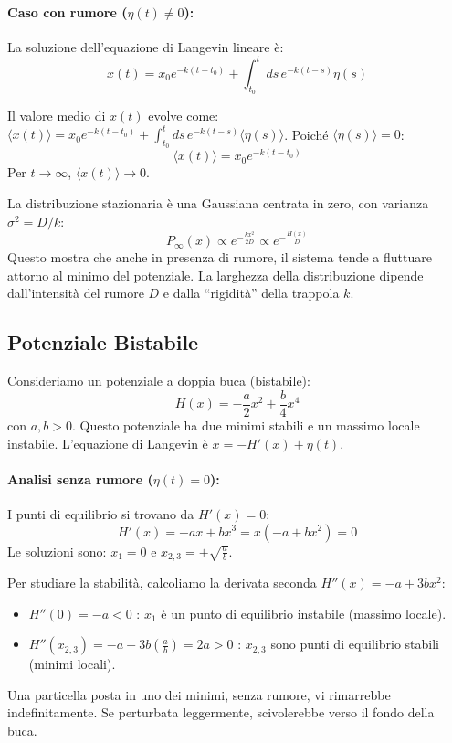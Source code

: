 \paragraph{Caso con rumore ($\eta(t)\neq 0$):}
La soluzione dell'equazione di Langevin lineare è:
\begin{equation}
x(t)=x_{0}e^{-k(t-t_0)}+\int_{t_0}^{t}ds\, e^{-k(t-s)}\eta(s)
\label{eq:sol_armonica}
\end{equation}

Il valore medio di $x(t)$ evolve come: $\langle x(t)\rangle = x_0 e^{-k(t-t_0)} + \int_{t_0}^{t}ds\, e^{-k(t-s)}\langle\eta(s)\rangle$. Poiché $\langle\eta(s)\rangle=0$:
\begin{equation}
\langle x(t)\rangle = x_0 e^{-k(t-t_0)}
\end{equation}
Per $t\rightarrow\infty$, $\langle x(t)\rangle \rightarrow 0$.

La distribuzione stazionaria è una Gaussiana centrata in zero, con varianza $\sigma^2 = D/k$:
\begin{equation}
P_{\infty}(x) \propto e^{-\frac{kx^{2}}{2D}} \propto e^{-\frac{H(x)}{D}}
\end{equation}
Questo mostra che anche in presenza di rumore, il sistema tende a fluttuare attorno al minimo del potenziale. La larghezza della distribuzione dipende dall'intensità del rumore $D$ e dalla ``rigidità'' della trappola $k$.

\subsection{Potenziale Bistabile}
Consideriamo un potenziale a doppia buca (bistabile):
\begin{equation}
H(x)=-\frac{a}{2}x^{2}+\frac{b}{4}x^{4}
\end{equation}
con $a,b >0$. Questo potenziale ha due minimi stabili e un massimo locale instabile. L'equazione di Langevin è $\dot{x}=-H'(x)+\eta(t)$.

\paragraph{Analisi senza rumore ($\eta(t)=0$):}
I punti di equilibrio si trovano da $H'(x)=0$:
\begin{equation}
H'(x)=-ax+bx^{3}=x(-a+bx^{2})=0
\end{equation}
Le soluzioni sono: $x_1=0$ e $x_{2,3}=\pm\sqrt{\frac{a}{b}}$.

Per studiare la stabilità, calcoliamo la derivata seconda $H''(x)=-a+3bx^{2}$:
\begin{itemize}
    \item $H''(0)=-a < 0$ : $x_1$ è un punto di equilibrio instabile (massimo locale).
    \item $H''(x_{2,3})=-a+3b\left(\frac{a}{b}\right)=2a > 0$ : $x_{2,3}$ sono punti di equilibrio stabili (minimi locali).
\end{itemize}
Una particella posta in uno dei minimi, senza rumore, vi rimarrebbe indefinitamente. Se perturbata leggermente, scivolerebbe verso il fondo della buca.

